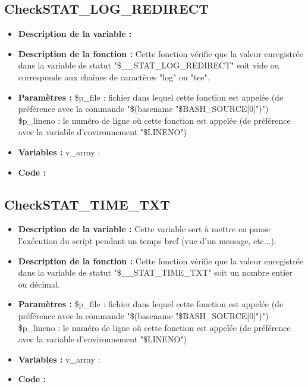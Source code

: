 \documentclass[a4paper,10pt]{article}
\begin{document}
\subsection{CheckSTAT\_LOG\_REDIRECT}
\begin{itemize}
    \item \textbf{Description de la variable :}

    \item \textbf{Description de la fonction :} Cette fonction vérifie que la valeur enregistrée dans la variable de statut "\$\_\_STAT\_LOG\_REDIRECT" soit vide ou corresponde aux chaînes de caractères "log" ou "tee".

    \item \textbf{Paramètres :} \$p\_file : fichier dans lequel cette fonction est appelée (de préférence avec la commande "\$(basename "\$BASH\_SOURCE[0]")")
    \$p\_lineno : le numéro de ligne où cette fonction est appelée (de préférence avec la variable d'environnement "\$LINENO")

    \item \textbf{Variables :} v\_array :

    \item \textbf{Code :}
\end{itemize}

\subsection{CheckSTAT\_TIME\_TXT}
\begin{itemize}
    \item \textbf{Description de la variable :} Cette variable sert à mettre en pause l'exécution du script pendant un temps bref (vue d'un message, etc...).

    \item \textbf{Description de la fonction :} Cette fonction vérifie que la valeur enregistrée dans la variable de statut "\$\_\_STAT\_TIME\_TXT" soit un nombre entier ou décimal.

    \item \textbf{Paramètres :} \$p\_file : fichier dans lequel cette fonction est appelée (de préférence avec la commande "\$(basename "\$BASH\_SOURCE[0]")")
    \$p\_lineno : le numéro de ligne où cette fonction est appelée (de préférence avec la variable d'environnement "\$LINENO")

    \item \textbf{Variables :} v\_array :

    \item \textbf{Code :}
\end{itemize}
\end{document}

